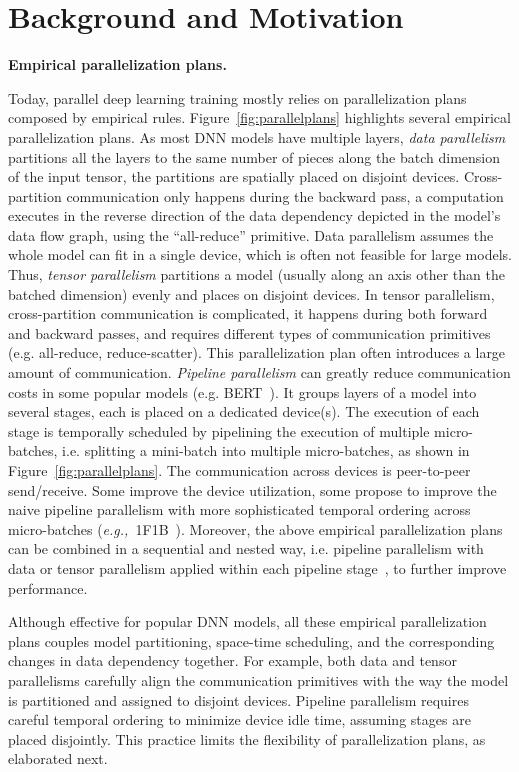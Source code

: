 \section{Background and Motivation}
\label{sec:background}

{\bf  Empirical parallelization plans. }

Today, parallel deep learning training mostly relies on parallelization plans composed by empirical rules. Figure~\ref{fig:parallelplans} highlights several empirical parallelization plans. As most DNN models have multiple layers, \emph{data parallelism} partitions all the layers to the same number of pieces along the batch dimension of the input tensor, the partitions are spatially placed on disjoint devices. Cross-partition communication only happens during the backward pass, a computation executes in the reverse direction of the data dependency depicted in the model's data flow graph, using the ``all-reduce'' primitive. Data parallelism assumes the whole model can fit in a single device, which is often not feasible for large models. Thus, \emph{tensor parallelism} partitions a model (usually along an axis other than the batched dimension) evenly and places on disjoint devices. In tensor parallelism, cross-partition communication is complicated, it happens during both forward and backward passes, and requires different types of communication primitives (e.g. all-reduce, reduce-scatter). This parallelization plan often introduces a large amount of communication. \emph{Pipeline parallelism} can greatly reduce communication costs in some popular models (e.g. BERT~\cite{devlin2018bert}). It groups layers of a model into several stages, each is placed on a dedicated device(s). The execution of each stage is temporally scheduled by pipelining the execution of multiple micro-batches, i.e. splitting a mini-batch into multiple micro-batches, as shown in Figure~\ref{fig:parallelplans}. The communication across devices is peer-to-peer send/receive. Some improve the device utilization, some propose to improve the naive pipeline parallelism with more sophisticated temporal ordering across micro-batches ({\it e.g.,\ }1F1B~\cite{dapple}). Moreover, the above empirical parallelization plans can be combined in a sequential and nested way, i.e. pipeline parallelism with data or tensor parallelism applied within each pipeline stage~\cite{megatron1, gspmd, alpa}, to further improve performance.

Although effective for popular DNN models, all these empirical parallelization plans couples model partitioning, space-time scheduling, and the corresponding changes in data dependency together. For example, both data and tensor parallelisms carefully align the communication primitives with the way the model is partitioned and assigned to disjoint devices. Pipeline parallelism requires careful temporal ordering to minimize device idle time, assuming stages are placed disjointly. This practice limits the flexibility of parallelization plans, as elaborated next.

